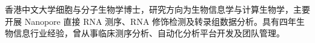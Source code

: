 \begin{cvparagraph}
香港中文大学细胞与分子生物学博士，研究方向为生物信息学与计算生物学，主要开展 Nanopore 直接 RNA 测序、RNA 修饰检测及转录组数据分析。具有四年生物信息行业经验，曾从事临床测序分析、自动化分析平台开发及团队管理。
\end{cvparagraph}
